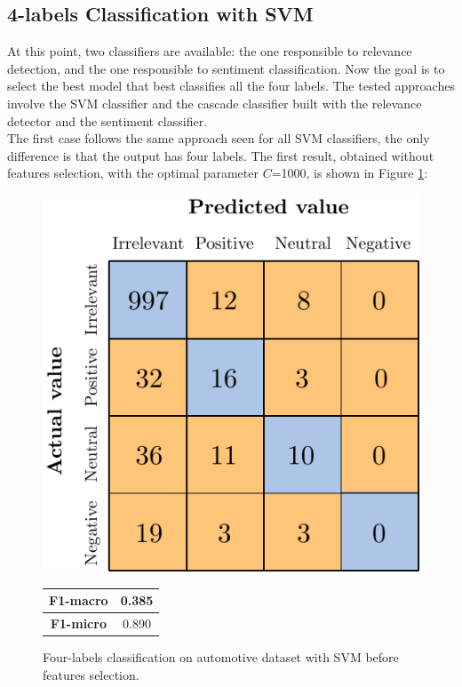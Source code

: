 \subsection{4-labels Classification with SVM}

At this point, two classifiers are available: the one responsible to relevance detection, and the one responsible to sentiment classification. Now the goal is to select the best model that best classifies all the four labels. The tested approaches involve the SVM classifier and the cascade classifier built with the relevance detector and the sentiment classifier.\\
The first case follows the same approach seen for all SVM classifiers, the only difference is that the output has four labels. The first result, obtained without features selection, with the optimal parameter $C$=1000, is shown in Figure \ref{fig:ita_4l_svm_bfs}:

\begin{figure}[H]
	\begin{minipage}[b]{0.6\linewidth}
		\centering
		\includegraphics[scale=1]{figures/conf_matrices/ita_4l_svm/ita_4l_svm_bfs.pdf}
	\end{minipage}
	\begin{minipage}[b]{0.3\linewidth}
		\begin{tabular}[b]{ | c | c | } 
			\hline
			\textbf{F1-macro} & 0.385 \\
			\hline
			\textbf{F1-micro} & 0.890 \\ 
			\hline
		\end{tabular}
	\end{minipage}
	\caption{Four-labels classification on automotive dataset with SVM before features selection.}
	\label{fig:ita_4l_svm_bfs}
\end{figure}



